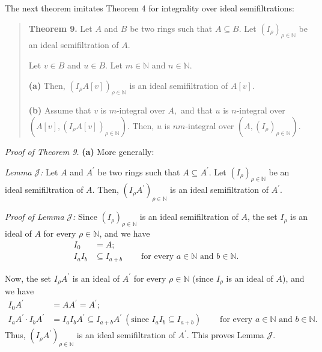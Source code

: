 \documentclass[12pt,final,notitlepage,onecolumn]{article}%
\begin{document}
The next theorem imitates Theorem 4 for integrality over ideal semifiltrations:

\begin{quote}
\textbf{Theorem 9.} Let $A$ and $B$ be two rings such that $A\subseteq B$. Let
$\left(  I_{\rho}\right)  _{\rho\in\mathbb{N}}$ be an ideal semifiltration of
$A$.

Let $v\in B$ and $u\in B$. Let $m\in\mathbb{N}$ and $n\in\mathbb{N}$.

\textbf{(a)} Then, $\left(  I_{\rho}A\left[  v\right]  \right)  _{\rho
\in\mathbb{N}}$ is an ideal semifiltration of $A\left[  v\right]  $.

\textbf{(b)} Assume that $v$ is $m$-integral over $A,$ and that $u$ is
$n$-integral over $\left(  A\left[  v\right]  ,\left(  I_{\rho}A\left[
v\right]  \right)  _{\rho\in\mathbb{N}}\right)  $. Then, $u$ is $nm$-integral
over $\left(  A,\left(  I_{\rho}\right)  _{\rho\in\mathbb{N}}\right)  $.
\end{quote}

\textit{Proof of Theorem 9.} \textbf{(a)} More generally:

\textit{Lemma }$\mathcal{J}$\textit{:} Let $A$ and $A^{\prime}$ be two rings
such that $A\subseteq A^{\prime}$. Let $\left(  I_{\rho}\right)  _{\rho
\in\mathbb{N}}$ be an ideal semifiltration of $A$. Then, $\left(  I_{\rho
}A^{\prime}\right)  _{\rho\in\mathbb{N}}$ is an ideal semifiltration of
$A^{\prime}$.

\textit{Proof of Lemma }$\mathcal{J}$\textit{:} Since $\left(  I_{\rho
}\right)  _{\rho\in\mathbb{N}}$ is an ideal semifiltration of $A$, the set
$I_{\rho}$ is an ideal of $A$ for every $\rho\in\mathbb{N}$, and we have%
\begin{align*}
I_{0}  &  =A;\\
I_{a}I_{b}  &  \subseteq I_{a+b}\ \ \ \ \ \ \ \ \ \ \text{for every }%
a\in\mathbb{N}\text{ and }b\in\mathbb{N}.
\end{align*}


Now, the set $I_{\rho}A^{\prime}$ is an ideal of $A^{\prime}$ for every
$\rho\in\mathbb{N}$ (since $I_{\rho}$ is an ideal of $A$), and we have%
\begin{align*}
I_{0}A^{\prime}  &  =AA^{\prime}=A^{\prime};\\
I_{a}A^{\prime}\cdot I_{b}A^{\prime}  &  =I_{a}I_{b}A^{\prime}\subseteq
I_{a+b}A^{\prime}\ \left(  \text{since }I_{a}I_{b}\subseteq I_{a+b}\right)
\ \ \ \ \ \ \ \ \ \ \text{for every }a\in\mathbb{N}\text{ and }b\in\mathbb{N}.
\end{align*}
Thus, $\left(  I_{\rho}A^{\prime}\right)  _{\rho\in\mathbb{N}}$ is an ideal
semifiltration of $A^{\prime}$. This proves Lemma $\mathcal{J}$.
\end{document}
